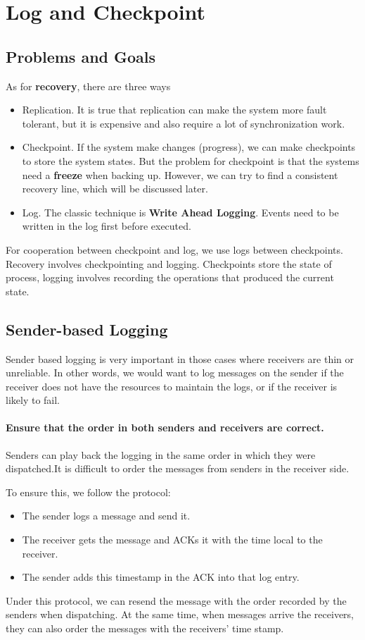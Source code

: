 \chapter{Log and Checkpoint}

\section{Problems and Goals}
As for \textbf{recovery}, there are three ways
\begin{itemize}
    \item Replication. It is true that replication can make the system more fault tolerant, but it is expensive and also require a lot of synchronization work.
    \item Checkpoint. If the system make changes (progress), we can make checkpoints to store the system states. But the problem for checkpoint is that the systems need a \textbf{freeze} when backing up. However, we can try to find a consistent recovery line, which will be discussed later.
    \item Log. The classic technique is \textbf{Write Ahead Logging}. Events need to be written in the log first before executed.
\end{itemize}

For cooperation between checkpoint and log, we use logs between checkpoints. Recovery involves checkpointing and logging. Checkpoints store the state of process, logging involves recording the operations that produced the current state.

\section{Sender-based Logging}
Sender based logging is very important in those cases where receivers are thin or unreliable. In other words, we would want to log messages on the sender if the receiver does not have the resources to maintain the logs, or if the receiver is likely to fail. 

\subsubsection{Ensure that the order in both senders and receivers are correct.}

Senders can play back the logging in the same order in which they were dispatched.It is difficult to order the messages from senders in the receiver side.

To ensure this, we follow the protocol:
\begin{itemize}
    \item The sender logs a message and send it.
    \item The receiver gets the message and ACKs it with the time local to the receiver.
    \item The sender adds this timestamp in the ACK into that log entry.
\end{itemize}
Under this protocol, we can resend the message with the order recorded by the senders when dispatching. At the same time, when messages arrive the receivers, they can also order the messages with the receivers' time stamp.

